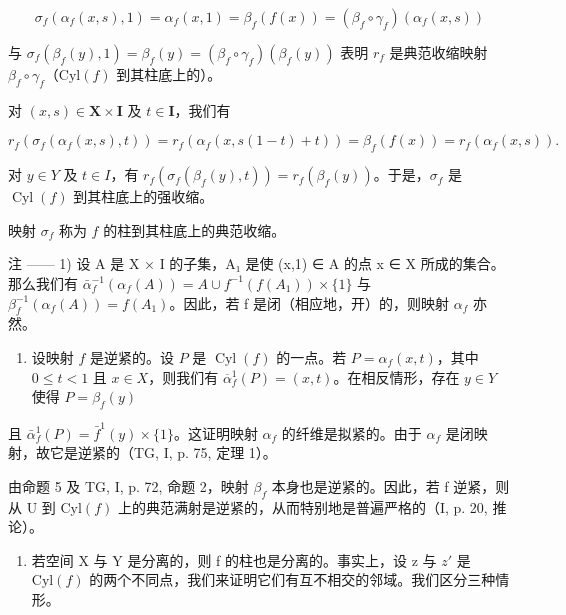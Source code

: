 \[
\sigma_ {f} \left(\alpha_ {f} (x, s), 1\right) = \alpha_ {f} (x, 1) = \beta_ {f} (f (x)) = \left(\beta_ {f} \circ \gamma_ {f}\right) \left(\alpha_ {f} (x, s)\right)
\]

与 \(\sigma_{f}(\beta_{f}(y),1) = \beta_{f}(y) = (\beta_{f}\circ \gamma_{f})(\beta_{f}(y))\) 表明 \(r_f\) 是典范收缩映射 \(\beta_{f}\circ \gamma_{f}\)（\(\mathrm{Cyl}(f)\) 到其柱底上的）。

对 \((x,s)\in \mathbf{X}\times \mathbf{I}\) 及 \(t\in \mathbf{I}\)，我们有

\[
r _ {f} \left(\sigma_ {f} \left(\alpha_ {f} (x, s), t\right)\right) = r _ {f} \left(\alpha_ {f} (x, s (1 - t) + t)\right) = \beta_ {f} (f (x)) = r _ {f} \left(\alpha_ {f} (x, s)\right).
\]

对 \(y \in Y\) 及 \(t \in I\)，有 \(r_{f}(\sigma_{f}(\beta_{f}(y), t)) = r_{f}(\beta_{f}(y))\)。于是，\(\sigma_{f}\) 是 \(\operatorname{Cyl}(f)\) 到其柱底上的强收缩。

映射 \(\sigma_{f}\) 称为 \(f\) 的柱到其柱底上的典范收缩。

注 —— 1) 设 A 是 X × I 的子集，A₁ 是使 (x,1) ∈ A 的点 x ∈ X 所成的集合。那么我们有 \(\bar{\alpha}_{f}^{-1}(\alpha_{f}(A)) = A \cup f^{-1}(f(A_{1})) \times \{1\}\) 与 \(\beta_{f}^{-1}(\alpha_{f}(A)) = f(A_{1})\)。因此，若 f 是闭（相应地，开）的，则映射 \(\alpha_{f}\) 亦然。

\begin{enumerate}
\def\labelenumi{\arabic{enumi})}
\setcounter{enumi}{1}
\tightlist
\item
  设映射 \(f\) 是逆紧的。设 \(P\) 是 \(\operatorname{Cyl}(f)\) 的一点。若 \(P = \alpha_f(x,t)\)，其中 \(0 \leqslant t < 1\) 且 \(x \in X\)，则我们有 \(\overline{\alpha}_f^1(P) = (x,t)\)。在相反情形，存在 \(y \in Y\) 使得 \(P = \beta_f(y)\)
\end{enumerate}

且 \(\bar{\alpha}_{f}^{1}(P) = \bar{f}^{1}(y) \times \{1\}\)。这证明映射 \(\alpha_{f}\) 的纤维是拟紧的。由于 \(\alpha_{f}\) 是闭映射，故它是逆紧的（TG, I, p. 75, 定理 1）。

由命题 5 及 TG, I, p. 72, 命题 2，映射 \(\beta_f\) 本身也是逆紧的。因此，若 f 逆紧，则从 U 到 \(\mathrm{Cyl}(f)\) 上的典范满射是逆紧的，从而特别地是普遍严格的（I, p. 20, 推论）。

\begin{enumerate}
\def\labelenumi{\arabic{enumi})}
\setcounter{enumi}{2}
\tightlist
\item
  若空间 X 与 Y 是分离的，则 f 的柱也是分离的。事实上，设 z 与 \(z'\) 是 \(\mathrm{Cyl}(f)\) 的两个不同点，我们来证明它们有互不相交的邻域。我们区分三种情形。
\end{enumerate}


